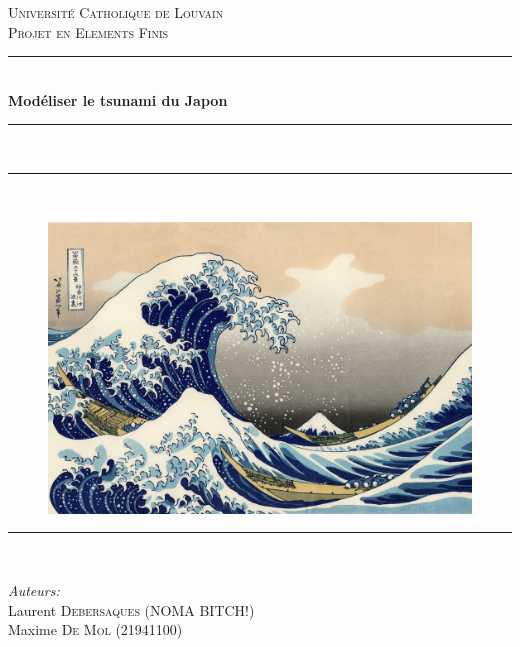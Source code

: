 \documentclass[a4paper,11pt]{article}
\newcommand{\HRule}{\rule{\linewidth}{0.5mm}}
\begin{document}
\begin{titlepage}

  \begin{center}


    \textsc{\Large Université Catholique de Louvain}\\[0.5cm]

    \textsc{\LARGE{ Projet en Elements Finis}}\\[0.2cm]


    \HRule \\[0.2cm]
    {\huge \bfseries Modéliser le tsunami du Japon}\\ %
    \HRule \\[0.2cm]

    \HRule \\[0.2cm]
        \end{center}
      \begin{figure}[h!]
      \begin{center}
      \includegraphics[width=14cm]{BigWave.jpg}
      \end{center}
      \end{figure}

    \begin{center}
    \HRule \\[0.2cm]
  \end{center}

    \begin{minipage}{0.48\textwidth}
      \begin{flushleft} \large
        \textit{Auteurs:}\\
        Laurent \textsc{Debersaques } (NOMA BITCH!)\\
        Maxime \textsc{De Mol} (21941100)\\


\end{flushleft}
\end{minipage}
\end{titlepage}
\end{document}

